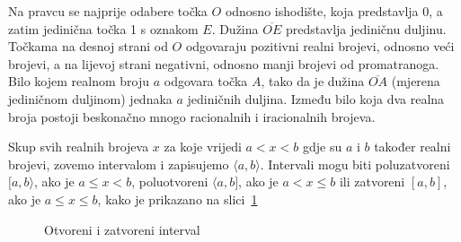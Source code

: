 Na pravcu se najprije odabere točka $O$ odnosno ishodište, koja predstavlja 0, a zatim jedinična točka 1 s oznakom $E$.
Dužina $\overline{OE}$ predstavlja jediničnu duljinu.
Točkama na desnoj strani od $O$ odgovaraju pozitivni realni brojevi, odnosno veći brojevi, a na lijevoj strani negativni, odnosno manji brojevi od promatranoga.
Bilo kojem realnom broju $a$ odgovara točka $A$, tako da je dužina $\overline{OA}$ (mjerena jediničnom duljinom) jednaka $a$ jediničnih duljina.
Između bilo koja dva realna broja postoji beskonačno mnogo racionalnih i iracionalnih brojeva.

Skup svih realnih brojeva $x$ za koje vrijedi $a<x<b$ gdje su $a$ i $b$ također realni brojevi, zovemo intervalom i zapisujemo $\langle a,b \rangle$.
Intervali mogu biti poluzatvoreni $[a,b \rangle$, ako je $a \leq x<b$, poluotvoreni $\langle a,b]$, ako je $a<x \leq b$ ili zatvoreni $[a,b]$, ako je $a \leq x \leq b$, kako je prikazano na slici~\ref{fig:otvoreni_i_zatvoreni_interval}

\begin{figure}[ht]
\begin{center}\vspace{0.5cm}

\vspace{0.5cm}
\end{center}
\caption{Otvoreni i zatvoreni interval}\label{fig:otvoreni_i_zatvoreni_interval}
\end{figure}

